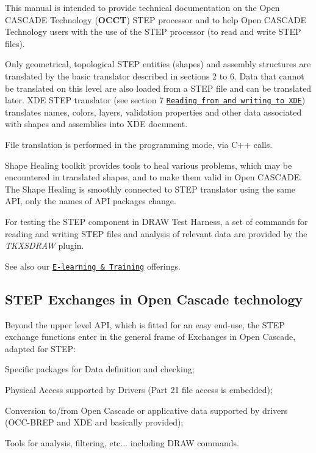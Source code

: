 This manual is intended to provide technical documentation on the Open C\+A\+S\+C\+A\+DE Technology ({\bfseries O\+C\+CT}) S\+T\+EP processor and to help Open C\+A\+S\+C\+A\+DE Technology users with the use of the S\+T\+EP processor (to read and write S\+T\+EP files).

Only geometrical, topological S\+T\+EP entities (shapes) and assembly structures are translated by the basic translator described in sections 2 to 6. Data that cannot be translated on this level are also loaded from a S\+T\+EP file and can be translated later. X\+DE S\+T\+EP translator (see section 7 \href{#occt_step_7}{\tt Reading from and writing to X\+DE}) translates names, colors, layers, validation properties and other data associated with shapes and assemblies into X\+DE document.

File translation is performed in the programming mode, via C++ calls.

Shape Healing toolkit provides tools to heal various problems, which may be encountered in translated shapes, and to make them valid in Open C\+A\+S\+C\+A\+DE. The Shape Healing is smoothly connected to S\+T\+EP translator using the same A\+PI, only the names of A\+PI packages change.

For testing the S\+T\+EP component in D\+R\+AW Test Harness, a set of commands for reading and writing S\+T\+EP files and analysis of relevant data are provided by the {\itshape T\+K\+X\+S\+D\+R\+AW} plugin.

See also our \href{http://www.opencascade.com/content/tutorial-learning}{\tt E-\/learning \& Training} offerings.\hypertarget{occt_user_guides__step_occt_step_1_1}{}\subsection{S\+T\+E\+P Exchanges in Open Cascade technology}\label{occt_user_guides__step_occt_step_1_1}
Beyond the upper level A\+PI, which is fitted for an easy end-\/use, the S\+T\+EP exchange functions enter in the general frame of Exchanges in Open Cascade, adapted for S\+T\+EP\+:


\begin{DoxyItemize}
\item Specific packages for Data definition and checking;
\item Physical Access supported by Drivers (Part 21 file access is embedded);
\item Conversion to/from Open Cascade or applicative data supported by drivers (O\+C\+C-\/\+B\+R\+EP and X\+DE ard basically provided);
\item Tools for analysis, filtering, etc... including D\+R\+AW commands.
\end{DoxyItemize}

